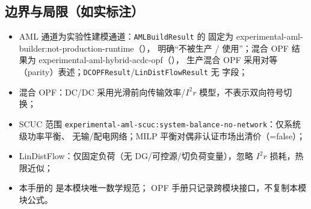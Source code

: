 \documentclass[UTF8,fontset=fandol,a4paper,11pt]{ctexart}
\begin{document}
\subsection{边界与局限（如实标注）}
\begin{itemize}
  \item AML 通道为实验性建模通道：\texttt{AMLBuildResult} 的  固定为
        experimental-aml-builder:not-production-runtime（），
        明确“不被生产 /
         使用”；混合 OPF 结果为
        experimental-aml-hybrid-acdc-opf（），
        生产混合 OPF 采用对等（parity）表述；\texttt{DCOPFResult}/\texttt{LinDistFlowResult}
        无  字段；
  \item 混合 OPF：DC/DC 采用光滑前向传输效率/$I^2r$ 模型，不表示双向符号切换；
  \item SCUC 范围 \texttt{experimental-aml-scuc:system-balance-no-network}：仅系统级功率平衡、
        无输/配电网络；MILP 平衡对偶非认证市场出清价（=false）；
  \item LinDistFlow：仅固定负荷（无 DG/可控源/切负荷变量），忽略 $I^2r$ 损耗，热限近似；
  \item 本手册的  是本模块唯一数学规范；
        OPF 手册只记录跨模块接口，不复制本模块公式。
\end{itemize}

\end{document}
